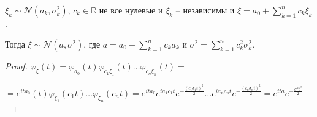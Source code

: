 \begin{theorem}
    $\xi_k \sim \mathcal{N} (a_k, \sigma_k^2)$, $c_k \in \mathbb{R}$ не все нулевые и $\xi_k$ -- независимы и $\xi = a_0 + \sum_{k = 1}^n c_k \xi_k$.

    Тогда $\xi \sim \mathcal{N} (a, \sigma^2)$, где
    $a = a_0 + \sum_{k = 1}^n c_k a_k$ и $\sigma^2 = \sum_{k = 1}^n c_k^2 \sigma_k^2$.
\end{theorem}

\begin{proof}
    $\varphi_{\xi} (t) = \varphi_{a_0} (t) \varphi_{c_1\xi_1} (t) \ldots \varphi_{c_n\xi_n} (t) = $

    $=  e^{ita_0} (t) \varphi_{\xi_1} (c_1t) \ldots \varphi_{\xi_n} (c_nt) =
    e^{ita_0} e^{ia_1c_1 t} e^{- \frac{(c_1 \sigma_1 t)^2}{2}} \ldots e^{ia_nc_n t} e^{- \frac{(c_n \sigma_n t)^2}{2}} =
    e^{ita} e^{- \frac{\sigma^2t^2}{2}} $
\end{proof}


